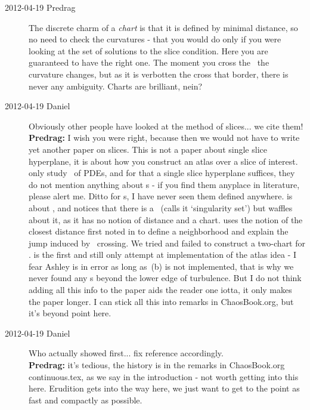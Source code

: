 \begin{description}
\item[2012-04-19 Predrag]                       \toCB
The discrete charm of a \emph{chart} is that it is defined by minimal
distance, so no need to check the curvatures - that you would do only if
you were looking at the set of solutions to the slice condition. Here you
are guaranteed to have the right one. The moment you cross the
\chartBord\ the curvature changes, but as it is {\color{red} verbotten}
the cross that border, there is never any ambiguity. Charts are
brilliant, nein?

\item[2012-04-19 Daniel]
    Obviously other people have looked at the method of slices... we cite
    them!
\\{\bf Predrag:} I wish you were right, because then we would not have
    to write yet another paper on slices. This is not a paper about
    single slice hyperplane, it is about how you construct an atlas over
    a slice of interest.  only
    study \reqva\ of PDEs, and for that a single slice hyperplane
    suffices, they do not mention anything about \chartBord s - if you
    find them anyplace in literature, please alert me. Ditto for
    \poincBord s, I have never seen them defined anywhere.
     is about \cLe, and notices that there is a
    \chartBord\ (calls it `singularity set') but waffles about it, as it
    has no notion of distance and a chart.  uses the
    notion of the closest distance first noted in
     to define a neighborhood and
    explain the jump induced by \chartBord\ crossing. We tried and failed
    to construct a two-chart for \cLe.  is the first and
    still only attempt at implementation of the atlas idea - I fear
    Ashley is in error as long as \,(b) is not
    implemented, that is why we never found any \rpo s beyond the lower
    edge of turbulence. But I do not think adding all this info to the
    paper aids the reader one iotta, it only makes the paper longer. I
    can stick all this into remarks in ChaosBook.org, but it's beyond
    point here.

\item[2012-04-19 Daniel]
    Who actually showed  first... fix reference
    accordingly.
\\{\bf Predrag:} it's tedious, the history is in the remarks in
    ChaosBook.org continuous.tex, as we say in the introduction - not
    worth getting into this here. Erudition gets into the way here, we
    just want to get to the point as fast and compactly as possible.


\end{description}
